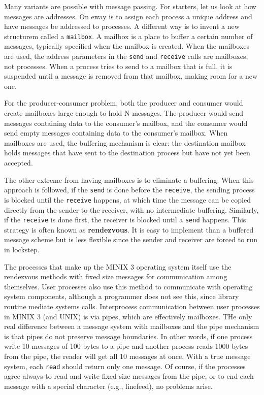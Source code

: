 \documentclass{book}
\newcommand {\kw}  [1] {\textbf{#1}}
\newcommand {\cmd} [1] {\texttt{#1}}
\begin{document}
Many variants are possible with message passing.
For starters, let us look at how messages are addresses.
On eway is to assign each process a unique address and have messages be addressed to processes.
A different way is to invent a new structurem called a \cmd{mailbox}.
A mailbox is a place to buffer a certain number of messages, typically specified when the mailbox is created.
When the mailboxes are used, the address parameters in the \cmd{send} and \cmd{receive} calls are mailboxes, not processes.
When a process tries to send to a mailbox that is full, 
it is suspended until a message is removed from that mailbox, making room for a new one.

For the producer-consumer problem, both the producer and consumer would create mailboxes large enough to hold N messages.
The producer would send messages containing data to the consumer's mailbox, 
and the consumer would send empty messages containing data to the consumer's mailbox.
When mailboxes are used, the buffering mechanism is clear:
the destination mailbox holds messages that have sent to the destination process but have not yet been accepted.

The other extreme from having mailboxes is to eliminate a buffering.
When this approach is followed, 
if the \cmd{send} is done before the \cmd{receive}, the sending process is blocked until the \cmd{receive} happens,
at which time the message can be copied directly from the sender to the receiver, with no intermediate buffering.
Similarly, if the \cmd{receive} is done first, the receiver is blocked until a \cmd{send} happens.
This strategy is often known as \kw{rendezvous}.
It is easy to implement than a buffered message scheme but is less flexible since the sender and receiver are forced to run in lockstep.

The processes that make up the MINIX 3 operating system itself use the rendezvous methods with fixed size messages for communication among themselves.
User processes also use this method to communicate with operating system components,
although a programmer does not see this, since library routine mediate systems calls.
Interprocess communication between user processes in MINIX 3 (and UNIX) is via pipes, which are effectively mailboxes.
THe only real difference between a message system with mailboxes and the pipe mechanism is that
pipes do not preserve message boundaries.
In other words, if one process write 10 messages of 100 bytes to a pipe and another process reads 1000 bytes from the pipe,
the reader will get all 10 messages at once.
With a true message system, each \cmd{read} should return only one message.
Of course, if the processes agree always to read and write fixed-size messages from the pipe, 
or to end each message with a special character (e.g., linefeed), no problems arise.
\end{document}
